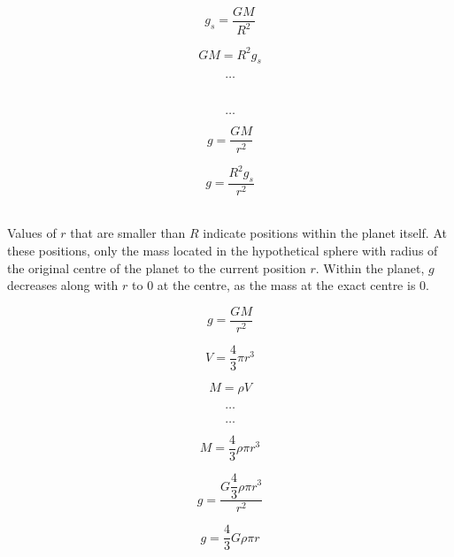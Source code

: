 \documentclass[12pt]{article}
\begin{document}
\begin{figure}[H]
\centering
\begin{minipage}{.8\textwidth}
\begin{tcolorbox}[
sharp corners=all,
colback=white,
colframe=white,
size=tight,
boxrule=0.2mm,
left=10mm, right=10mm
]
\begin{multicols}{2}
\noindent
\\
\[g_s = \dfrac{GM}{R^2}\]

\[GM = R^2g_s \]

\[\textbf{\ldots}\]
\\
\columnbreak
\\
\[\textbf{\ldots}\]

\[g = \dfrac{GM}{r^2}\]

\[g = \dfrac{R^2g_s}{r^2}\]
\\

\end{multicols}
\end{tcolorbox}
\end{minipage}
\end{figure}

Values of \(r\) that are smaller than \(R\) indicate positions within the planet itself. At these positions, only the mass located in the hypothetical sphere with radius of the original centre of the planet to the current position \(r\). Within the planet, \(g\) decreases along with \(r\) to 0 at the centre, as the mass at the exact centre is 0.

\begin{figure}[H]
\centering
\begin{minipage}{.8\textwidth}
\begin{tcolorbox}[
sharp corners=all,
colback=white,
colframe=white,
size=tight,
boxrule=0.2mm,
left=10mm, right=10mm
]
\begin{multicols}{2}
\noindent

\[g = \dfrac{GM}{r^2}\]

\[V = \dfrac{4}{3} \pi r^3\]

\[M = \rho V\]

\[\textbf{\ldots}\]
\columnbreak

\[\textbf{\ldots}\]

\[M = \dfrac{4}{3} \rho \pi r^3\]

\[g = \dfrac{G \dfrac{4}{3} \rho \pi r^3}{r^2}\]

\[g = \dfrac{4}{3} G \rho \pi r\]
\end{multicols}
\end{tcolorbox}
\end{minipage}
\end{figure}
\end{document}
